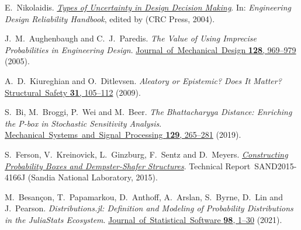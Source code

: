 {\raggedright%

\hangindent=0.33in {}\hypertarget{17677777724040662142}{}E.~Nikolaidis. \href{https://doi.org/10.1201/9780203483930}{\emph{Types of Uncertainty in Design Decision Making}}. In: \emph{Engineering Design Reliability Handbook}, edited by  (CRC Press, 2004).

\hangindent=0.33in {}\hypertarget{5841225584812469631}{}J.~M.~Aughenbaugh and C.~J.~Paredis. \emph{The Value of Using Imprecise Probabilities in Engineering Design}. \href{https://doi.org/10.1115/1.2204976}{Journal~of~Mechanical~Design \textbf{128}, 969–979} (2005).

\hangindent=0.33in {}\hypertarget{15087536451490649448}{}A.~D.~Kiureghian and O.~Ditlevsen. \emph{Aleatory or Epistemic? Does It Matter?} \href{https://doi.org/10.1016/j.strusafe.2008.06.020}{Structural~Safety \textbf{31}, 105–112} (2009).

\hangindent=0.33in {}\hypertarget{3640249115689488589}{}S.~Bi, M.~Broggi, P.~Wei and M.~Beer. \emph{The Bhattacharyya Distance: Enriching the P-box in Stochastic Sensitivity Analysis}. \href{https://doi.org/10.1016/j.ymssp.2019.04.035}{Mechanical~Systems~and~Signal~Processing \textbf{129}, 265–281} (2019).

\hangindent=0.33in {}\hypertarget{13630934291971494037}{}S.~Ferson, V.~Kreinovick, L.~Ginzburg, F.~Sentz and D.~Meyers. \href{https://doi.org/10.2172/809606}{\emph{Constructing Probability Boxes and Dempster-Shafer Structures}}. Technical Report~SAND2015-4166J (Sandia National Laboratory, 2015).

\hangindent=0.33in {}\hypertarget{4623761477557390374}{}M.~Besançon, T.~Papamarkou, D.~Anthoff, A.~Arslan, S.~Byrne, D.~Lin and J.~Pearson. \emph{Distributions.jl: Definition and Modeling of Probability Distributions in the JuliaStats Ecosystem}. \href{https://doi.org/10.18637/jss.v098.i16}{Journal~of~Statistical~Software \textbf{98}, 1–30} (2021).

}
